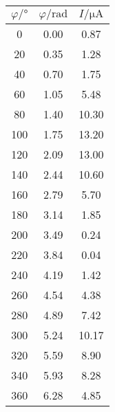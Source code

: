 \label{tab:tabpolarisation}
	\begin{tabular}{S[table-format=2.0]S[table-format=1.2]S[table-format=2.2]}
		\toprule
		{$\varphi / \si{\degree} $} & {$\varphi / \text{rad} $} & {$ I / \si{\micro\ampere}$} \\
		 & 0.00 & 0.87 \\
		20 & 0.35 & 1.28 \\
		40 & 0.70 & 1.75 \\
		60 & 1.05 & 5.48 \\
		80 & 1.40 & 10.30 \\
		100 & 1.75 & 13.20 \\
		120 & 2.09 & 13.00 \\
		140 & 2.44 & 10.60 \\
		160 & 2.79 & 5.70 \\
		180 & 3.14 & 1.85 \\
		200 & 3.49 & 0.24 \\
		220 & 3.84 & 0.04 \\
		240 & 4.19 & 1.42 \\
		260 & 4.54 & 4.38 \\
		280 & 4.89 & 7.42 \\
		300 & 5.24 & 10.17 \\
		320 & 5.59 & 8.90 \\
		340 & 5.93 & 8.28 \\
		360 & 6.28 & 4.85 \\
		\bottomrule
	\end{tabular}
